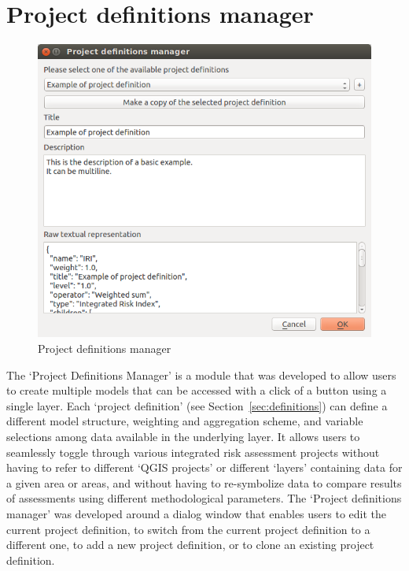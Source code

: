 \section{Project definitions manager}
\label{sec:project_definitions_manager}

\begin{figure}
    \centering
    \includegraphics[width=\textwidth]{../images/image13}
    \caption{Project definitions manager}
    \label{fig:project_definitions_manager}
\end{figure}

The `Project Definitions Manager' is a module that was developed to allow users
to create multiple models that can be accessed with a click of a button using a
single layer. Each `project definition' (see Section~\ref{sec:definitions}) can
define a different model structure, weighting and aggregation scheme, and
variable selections among data available in the underlying layer. It allows
users to seamlessly toggle through various integrated risk assessment projects
without having to refer to different `QGIS projects' or different `layers'
containing data for a given area or areas, and without having to re-symbolize
data to compare results of assessments using different methodological
parameters. The `Project definitions manager' was developed around a dialog
window that enables users to edit the current project definition, to switch
from the current project definition to a different one, to add a new project
definition, or to clone an existing project definition.

